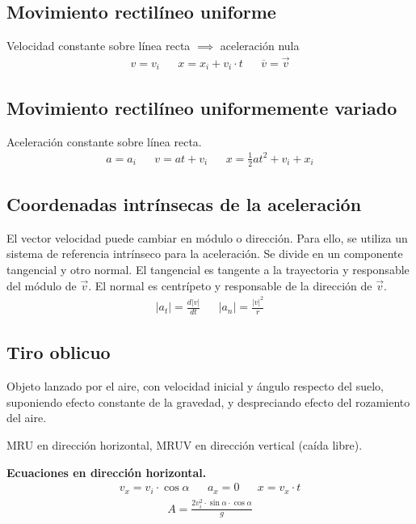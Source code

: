 \documentclass[12pt]{article}
\begin{document}
\subsection{Movimiento rectilíneo uniforme}

Velocidad constante sobre línea recta \(\implies\) aceleración nula
\begin{align*}
  v = v_{i} &  & x = x_{i} + v_{i} \cdot t &  & \overline{v} = \vec{v}
\end{align*}

\subsection{Movimiento rectilíneo uniformemente variado}

Aceleración constante sobre línea recta.
\begin{align*}
  a = a_{i} &  & v = at + v_{i} &  & x = \frac{1}{2}at^{2} + v_{i} + x_{i}
\end{align*}

\subsection{Coordenadas intrínsecas de la aceleración}

El vector velocidad puede cambiar en módulo o dirección.
Para ello, se utiliza un sistema de referencia intrínseco para la aceleración.
Se divide en un componente tangencial y otro normal.
El tangencial es tangente a la trayectoria y responsable del módulo de \(\vec{v}\).
El normal es centrípeto y responsable de la dirección de \(\vec{v}\).
\begin{align*}
  |a_{t}| = \frac{d|v|}{dt} &  & |a_{n}| = \frac{|v|^{2}}{r}
\end{align*}

\subsection{Tiro oblicuo}

Objeto lanzado por el aire,
con velocidad inicial y ángulo respecto del suelo,
suponiendo efecto constante de la gravedad,
y despreciando efecto del rozamiento del aire.

MRU en dirección horizontal,
MRUV en dirección vertical (caída libre).

\textbf{Ecuaciones en dirección horizontal.}
\begin{align*}
  v_{x} = v_{i}\cdot\cos \alpha &  & a_{x} = 0 &  & x = v_{x}\cdot t
\end{align*}
\begin{align*}
  A = \frac{2v_{i}^{2}\cdot\sin\alpha\cdot\cos\alpha}{g}
\end{align*}
\end{document}
